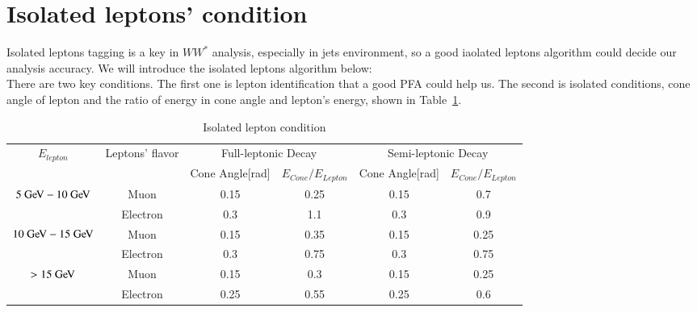 \documentclass[11pt,a4paper]{cepcnote}
\begin{document}
\section{Isolated leptons' condition}
\label{app:isolepcondition}
Isolated leptons tagging is a key in $WW^*$ analysis, especially in jets environment, so a good iaolated leptons algorithm
could decide our analysis accuracy. We will introduce the isolated leptons algorithm below:\\
There are two key conditions. The first one is lepton identification that a good PFA could help us.
The second is isolated conditions, cone angle of lepton and the ratio of energy in cone angle and lepton's energy, 
shown in Table~\ref{tab:isolep}.
\begin{table}[H]
\begin{center}
\begin{tabular}{cccccc}
\hline \hline
\multirow{2}{*}{$E_{lepton}$} & \multirow{2}{*}{Leptons' flavor} 	& \multicolumn{2}{c}{Full-leptonic Decay} 
& \multicolumn{2}{c}{Semi-leptonic Decay}\\
							&									&Cone Angle[rad]&$E_{Cone}/E_{Lepton}$
							&Cone Angle[rad]&$E_{Cone}/E_{Lepton}$\\
\hline
\multirow{2}{*}{$5\gev-10\gev$}	&			Muon					&0.15		&0.25		&0.15		&0.7	\\
							&			Electron				&0.3		&1.1		&0.3		&0.9	\\
\hline
\multirow{2}{*}{$10\gev-15\gev$}	&			Muon					&0.15		&0.35		&0.15		&0.25	\\
							&			Electron				&0.3		&0.75		&0.3		&0.75	\\
\hline
\multirow{2}{*}{$>15\gev$}	&			Muon					&0.15		&0.3		&0.15		&0.25	\\
							&			Electron				&0.25		&0.55		&0.25		&0.6	\\
\hline \hline
\end{tabular}
\caption{Isolated lepton condition}
\label{tab:isolep}
\end{center}
\end{table}
%
\end{document}
